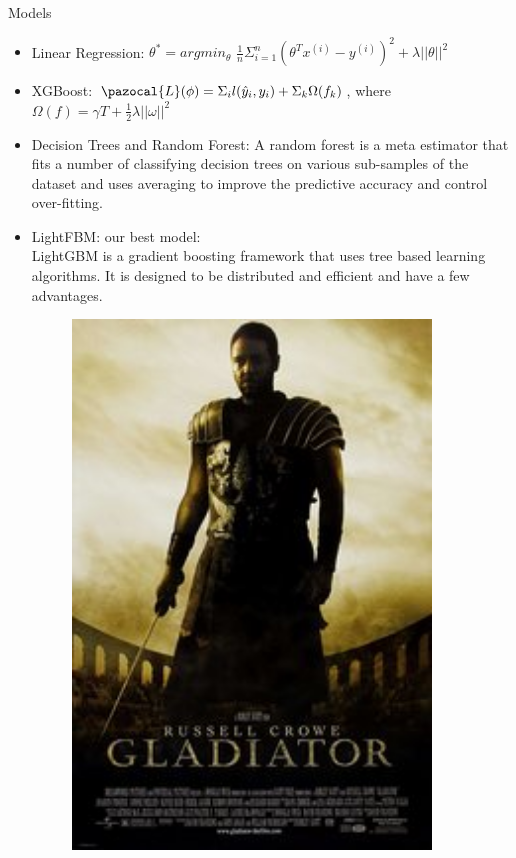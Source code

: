 \documentclass[final]{beamer}
\newlength{\onecolwid}
\newcommand{\Lb}{\pazocal{L}}
\begin{document}
\begin{frame}[t]
\begin{columns}[t]
\begin{column}{\onecolwid}
\begin{block}{Models}
\begin{itemize}
\item Linear Regression: $\theta^* = argmin_\theta$ $\frac{1}{n} \Sigma_{i=1}^{n}
(\theta^Tx^{(i)} - y^{(i)})^2 + \lambda||\theta||^2$

\item XGBoost: $\Lb (\phi) = \Sigma_i l(\hat{y}_i, y_i) + \Sigma_k \Omega (f_k) $, where  $\Omega (f) = \gamma T + \frac{1}{2}\lambda ||\omega||^2 $

\item Decision Trees and Random Forest: A random forest is a meta estimator that fits a number of classifying decision trees on various sub-samples of the dataset and uses averaging to improve the predictive accuracy and control over-fitting.

\item LightFBM: our best model: \\
LightGBM is a gradient boosting framework that uses tree based learning algorithms. It is designed to be distributed and efficient and have a few advantages.


\begin{minipage}{0.3\textwidth}
\begin{figure}[H]
\includegraphics[width=0.9\textwidth]{172495.jpg}
\end{figure}


\end{minipage}
\end{itemize}
\end{block}
\end{column}
\end{columns}
\end{frame}
\end{document}
